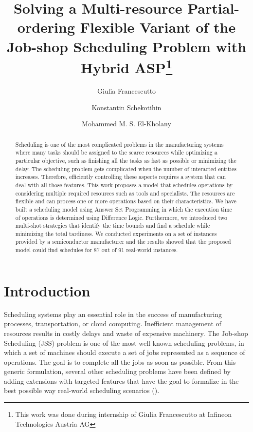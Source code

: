 \documentclass[submission,copyright,creativecommons]{eptcs}
\title{Solving a Multi-resource Partial-ordering Flexible Variant of the Job-shop Scheduling Problem with Hybrid ASP\thanks{This work was done during internship of Giulia Francescutto at Infineon Technologies Austria AG}}
\author{Giulia Francescutto
\institute{Siemens AG {\"O}sterreich\\ Vienna, Austria}
\email{giulia.francescutto@siemens.com}
\and
Konstantin Schekotihin
\institute{Alpen-Adria-Univeristy\\
Klagenfurt, Austria}
\email{konstantin.schekotihin@aau.at}
\and
Mohammed M. S. El-Kholany
\institute{Alpen-Adria-Univeristy, Klagenfurt, Austria}
\institute{Cairo University, Cairo, Egypt}
\email{mohammed.el-kholany@aau.at}
}
\begin{document}
\maketitle

\begin{abstract}
  Scheduling is one of the most complicated problems in the manufacturing systems where many tasks should be assigned to the scarce resources while optimizing a particular objective, such as finishing all the tasks as fast as possible or minimizing the delay. The scheduling problem gets complicated when the number of interacted entities increases. Therefore, efficiently controlling these aspects requires a system that can deal with all those features. This work proposes a model that schedules operations by considering multiple required resources such as tools and specialists. The resources are flexible and can process one or more operations based on their characteristics. We have built a scheduling model using Answer Set Programming in which the execution time of operations is determined using Difference Logic. Furthermore, we introduced two multi-shot strategies that identify the time bounds and find a schedule while minimizing the total tardiness. We conducted experiments on a set of instances provided by a semiconductor manufacturer and the results showed that the proposed model could find schedules for 87 out of 91 real-world instances.
\end{abstract}

\section{Introduction}
Scheduling systems play an essential role in the success of manufacturing processes, transportation, or cloud computing. Inefficient management of resources results in costly delays and waste of expensive machinery. The Job-shop Scheduling (JSS) problem is one of the most well-known scheduling problems, in which a set of machines should execute a set of jobs represented as a sequence of operations. The goal is to complete all the jobs as soon as possible. From this generic formulation, several other scheduling problems have been defined by adding extensions with targeted features that have the goal to formalize in the best possible way real-world scheduling scenarios (\cite{brucker1990job}). %
\end{document}
